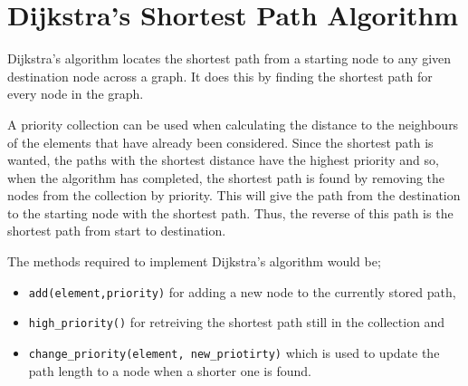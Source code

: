 \documentclass[11pt]{article} %
\begin{document}
\section{Dijkstra's Shortest Path Algorithm}

Dijkstra's algorithm locates the shortest path from a starting node to any
given destination node across a graph. It does this by finding the shortest
path for every node in the graph.

A priority collection can be used when calculating the distance to the
neighbours of the elements that have already been considered. Since the
shortest path is wanted, the paths with the shortest distance have the highest
priority and so, when the algorithm has completed, the shortest path is found
by removing the nodes from the collection by priority. This will give the path
from the destination to the starting node with the shortest path. Thus, the
reverse of this path is the shortest path from start to destination.

The methods required to implement Dijkstra's algorithm would be;
\begin{itemize}
	\item \texttt{add(element,priority)} for adding a new node to the currently
		stored path,
	\item \texttt{high\_priority()} for retreiving the shortest path still in
		the collection and
	\item \texttt{change\_priority(element, new\_priotirty)} which is used to
		update the path length to a node when a shorter one is found.
\end{itemize}
\end{document}
